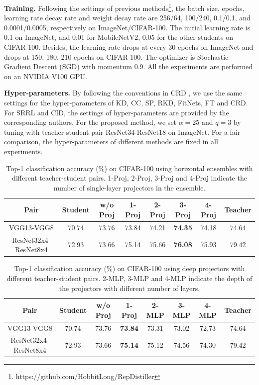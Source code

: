 \documentclass{article}
\begin{document}
\textbf{Training. }Following the settings of previous methods\footnote{https://github.com/HobbitLong/RepDistiller}, the batch size, epochs, learning rate decay rate and weight decay rate are 256/64, 100/240, 0.1/0.1, and 0.0001/0.0005, respectively on ImageNet/CIFAR-100. The initial learning rate is 0.1 on ImageNet, and 0.01 for MobileNetV2, 0.05 for the other students on CIFAR-100. Besides, the learning rate drops at every 30 epochs on ImageNet and drops at 150, 180, 210 epochs on CIFAR-100. The optimizer is Stochastic Gradient Descent (SGD) with momentum 0.9. All the experiments are performed on an NVIDIA V100 GPU. 

\textbf{Hyper-parameters.} By following the conventions in CRD \cite{crd}, we use the same settings for the hyper-parameters of KD, CC, SP, RKD, FitNets, FT and CRD. For SRRL and CID, the settings of hyper-parameters are provided by the corresponding authors. For the proposed method, we set $\alpha=25$ and $q=3$ by tuning with teacher-student pair ResNet34-ResNet18 on ImageNet. For a fair comparison, the hyper-parameters of different methods are fixed in all experiments.

\begin{table}
    \caption{Top-1 classification accuracy ($\%$) on CIFAR-100 using horizontal ensembles with different teacher-student pairs. 1-Proj, 2-Proj, 3-Proj and 4-Proj indicate the number of single-layer projectors in the ensemble.}
    \label{ablationE}
    \centering
    \begin{tabular}{c|cccccc|c}
    \hline
    Pair &Student &w/o Proj &1-Proj &2-Proj &3-Proj &4-Proj  &Teacher\\
    \hline 
    \multirow{1}{*}{VGG13-VGG8} &70.74 &73.76  &73.84  &74.21  &\textbf{74.35} &74.18  &74.64  \\
    \hline
    \multirow{1}{*}{ResNet32x4-ResNet8x4}  &72.93 &73.66  &75.14  &75.66  &\textbf{76.08}  &75.93 &79.42   \\
    \hline
    \end{tabular}
\end{table}

\begin{table}
    \caption{Top-1 classification accuracy ($\%$) on CIFAR-100 using deep projectors with different teacher-student pairs. 2-MLP, 3-MLP and 4-MLP indicate the depth of the projectors with different number of layers.}
    \label{ablationC}
    \centering
    \begin{tabular}{c|cccccc|c}
    \hline
    Pair &Student &w/o Proj &1-Proj &2-MLP &3-MLP &4-MLP &Teacher \\
    \hline 
    \multirow{1}{*}{VGG13-VGG8} &70.74  &73.76  &\textbf{73.84}  &73.31  &73.02 &72.73  &74.64   \\
    \hline
    \multirow{1}{*}{ResNet32x4-ResNet8x4}  &72.93 &73.66  &\textbf{75.14}  &75.12  &74.56 &74.30 &79.42   \\
    \hline
    \end{tabular}
\end{table}
\end{document}
